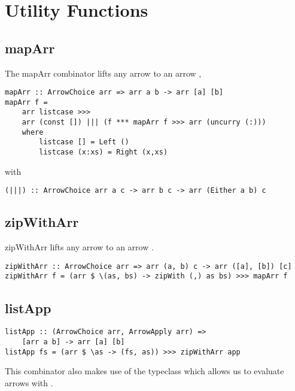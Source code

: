 \section{Utility Functions}\label{utilfns}
\subsection{mapArr}
The mapArr combinator lifts any arrow  to an arrow  \cite{programming_with_arrows},
\begin{lstlisting}[frame=htrbl]
mapArr :: ArrowChoice arr => arr a b -> arr [a] [b]
mapArr f =
	arr listcase >>>
	arr (const []) ||| (f *** mapArr f >>> arr (uncurry (:)))
	where
		listcase [] = Left ()
		listcase (x:xs) = Right (x,xs)
\end{lstlisting}
with
\begin{lstlisting}[frame=htrbl]
(|||) :: ArrowChoice arr a c -> arr b c -> arr (Either a b) c
\end{lstlisting}
\frbreak

\subsection{zipWithArr}
zipWithArr lifts any arrow  to an arrow .
\begin{lstlisting}[frame=htrbl]
zipWithArr :: ArrowChoice arr => arr (a, b) c -> arr ([a], [b]) [c]
zipWithArr f = (arr $ \(as, bs) -> zipWith (,) as bs) >>> mapArr f
\end{lstlisting}
\frbreak

\subsection{listApp}
\begin{lstlisting}[frame=htrbl]
listApp :: (ArrowChoice arr, ArrowApply arr) =>
	[arr a b] -> arr [a] [b]
listApp fs = (arr $ \as -> (fs, as)) >>> zipWithArr app
\end{lstlisting}
This combinator also makes use of the  typeclass which allows us to evaluate arrows with .
